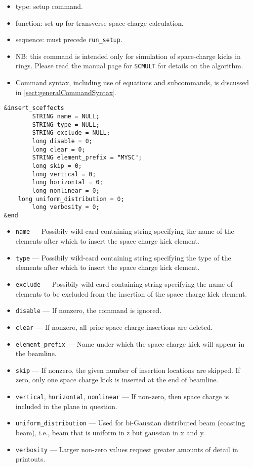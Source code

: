 \documentclass[11pt]{article}
\begin{document}
\begin{itemize}
\item type: setup command.
\item function: set up for transverse space charge calculation.  
\item sequence: must precede \verb|run_setup|.
\item NB: this command is intended only for simulation of space-charge kicks in rings. Please read the manual page
  for \verb|SCMULT| for details on the algorithm.
\item Command syntax, including use of equations and subcommands, is discussed in \ref{sect:generalCommandSyntax}.
\end{itemize}

\begin{verbatim}
&insert_sceffects
        STRING name = NULL;
        STRING type = NULL;
        STRING exclude = NULL;
        long disable = 0;
        long clear = 0;
        STRING element_prefix = "MYSC";
        long skip = 0;
        long vertical = 0;
        long horizontal = 0;
        long nonlinear = 0;
	long uniform_distribution = 0;
        long verbosity = 0;
&end
\end{verbatim}

\begin{itemize}
\item \verb|name| --- Possibily wild-card containing string specifying the
	name of the elements after which to insert the space charge kick element.
\item \verb|type| --- Possibily wild-card containing string specifying the
        type of the elements after which to insert the space charge kick element.
\item \verb|exclude| --- Possibily wild-card containing string specifying 
	the name of elements to be excluded from the insertion of the space charge kick element.
\item \verb|disable| --- If nonzero, the command is ignored.
\item \verb|clear| --- If nonzero, all prior space charge insertions are deleted.
\item \verb|element_prefix| --- Name under which the space charge kick will appear in the beamline.
\item \verb|skip| --- If nonzero, the given number of insertion locations are skipped. 
        If zero, only one space charge kick is inserted at the end of beamline. 
\item \verb|vertical|, \verb|horizontal|, \verb|nonlinear| --- If non-zero, then space charge is
included in the plane in question.
\item \verb|uniform_distribution| --- Used for bi-Gaussian distributed beam (coasting beam), i.e., beam that is
  uniform in z but gaussian in x and y.
\item \verb|verbosity| --- Larger non-zero values request greater amounts of detail in printouts.
\end{itemize}
\end{document}
